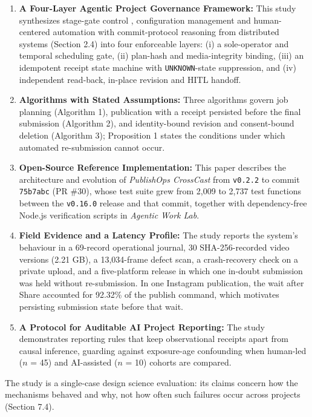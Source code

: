 \documentclass[11pt,a4paper]{article}
\theoremstyle{definition}
\begin{document}
\begin{enumerate}[leftmargin=1.8em]
    \item \textbf{A Four-Layer Agentic Project Governance Framework:} This study synthesizes stage-gate control \citep{Cooper1990}, configuration management \citep{Whyte2016} and human-centered automation \citep{Parasuraman2000, Shneiderman2020} with commit-protocol reasoning from distributed systems (Section 2.4) into four enforceable layers: (i) a sole-operator and temporal scheduling gate, (ii) plan-hash and media-integrity binding, (iii) an idempotent receipt state machine with \texttt{UNKNOWN}-state suppression, and (iv) independent read-back, in-place revision and HITL handoff.
    \item \textbf{Algorithms with Stated Assumptions:} Three algorithms govern job planning (Algorithm 1), publication with a receipt persisted before the final submission (Algorithm 2), and identity-bound revision and consent-bound deletion (Algorithm 3); Proposition 1 states the conditions under which automated re-submission cannot occur.
    \item \textbf{Open-Source Reference Implementation:} This paper describes the architecture and evolution of \emph{PublishOps CrossCast} from \texttt{v0.2.2} to commit \texttt{75b7abc} (PR \#30), whose test suite grew from 2,009 to 2,737 test functions between the \texttt{v0.16.0} release and that commit, together with dependency-free Node.js verification scripts in \emph{Agentic Work Lab}.
    \item \textbf{Field Evidence and a Latency Profile:} The study reports the system's behaviour in a 69-record operational journal, 30 SHA-256-recorded video versions (2.21 GB), a 13,034-frame defect scan, a crash-recovery check on a private upload, and a five-platform release in which one in-doubt submission was held without re-submission. In one Instagram publication, the wait after Share accounted for 92.32\% of the publish command, which motivates persisting submission state before that wait.
    \item \textbf{A Protocol for Auditable AI Project Reporting:} The study demonstrates reporting rules that keep observational receipts apart from causal inference, guarding against exposure-age confounding when human-led ($n$ = 45) and AI-assisted ($n$ = 10) cohorts are compared.
\end{enumerate}

The study is a single-case design science evaluation: its claims concern how the mechanisms behaved and why, not how often such failures occur across projects (Section 7.4).
\end{document}
